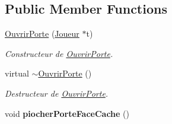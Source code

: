 \subsection*{Public Member Functions}
\begin{DoxyCompactItemize}
\item 
\hyperlink{class_ouvrir_porte_a6cd824c78a2293d060721cf8a89bf89b}{Ouvrir\-Porte} (\hyperlink{class_joueur}{Joueur} $\ast$t)
\begin{DoxyCompactList}\small\item\em Constructeur de \hyperlink{class_ouvrir_porte}{Ouvrir\-Porte}. \end{DoxyCompactList}\item 
\hypertarget{class_ouvrir_porte_a001086091ec39ba7c389cdb49c89b722}{virtual \hyperlink{class_ouvrir_porte_a001086091ec39ba7c389cdb49c89b722}{$\sim$\-Ouvrir\-Porte} ()}\label{class_ouvrir_porte_a001086091ec39ba7c389cdb49c89b722}

\begin{DoxyCompactList}\small\item\em Destructeur de \hyperlink{class_ouvrir_porte}{Ouvrir\-Porte}. \end{DoxyCompactList}\item 
\hypertarget{class_ouvrir_porte_aea016cbe6d05c27fcc24bd65565bb657}{void {\bfseries piocher\-Porte\-Face\-Cache} ()}\label{class_ouvrir_porte_aea016cbe6d05c27fcc24bd65565bb657}


\end{DoxyCompactItemize}
